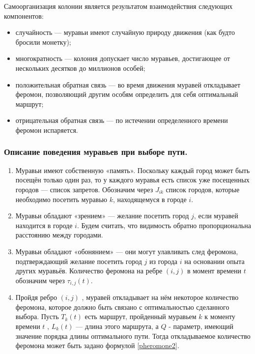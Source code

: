 Самоорганизация колонии является результатом взаимодействия следующих компонентов:
\begin{itemize}
	\item случайность --- муравьи имеют случайную природу движения (как будто бросили монетку);
	\item многократность --- колония допускает число муравьев, достигающее от нескольких десятков до миллионов особей;
	\item положительная обратная связь --- во время движения муравей откладывает феромон, позволяющий другим особям определить для себя оптимальный маршрут;
	\item отрицательная обратная связь --- по истечении определенного времени феромон испаряется.
\end{itemize}

\subsubsection{Описание поведения муравьев при выборе пути.}

\begin{enumerate}
	\item Муравьи имеют собственную «память».
	Поскольку каждый город может быть посещён только один раз, то у каждого муравья есть список уже посещенных городов --- список запретов.
	Обозначим через $J_{ik}$ список городов, которые необходимо посетить муравью $k$, находящемуся в городе $i$.
	
	\item Муравьи обладают «зрением» --- желание посетить город $j$, если муравей находится в городе $i$.
	Будем считать, что видимость обратно пропорциональна расстоянию между городами.
	
	\item Муравьи обладают «обонянием» --- они могут улавливать след феромона, подтверждающий желание посетить город $j$ из города $i$ на основании опыта других муравьёв.
	Количество феромона на ребре $(i,j)$ в момент времени $t$ обозначим через  $\tau_{i,j} (t)$.
	
	\item Пройдя ребро $(i,j)$ , муравей откладывает на нём некоторое количество феромона, которое должно быть связано с оптимальностью сделанного выбора.
	Пусть $T _{k} (t)$ есть маршрут, пройденный муравьем $k$ к моменту времени $t$ , $L _{k} (t)$ --- длина этого маршрута, а $Q$ - параметр,
	имеющий значение порядка длины оптимального пути. Тогда откладываемое количество феромона может быть задано формулой \eqref{pheromone2}.	
\end{enumerate}

